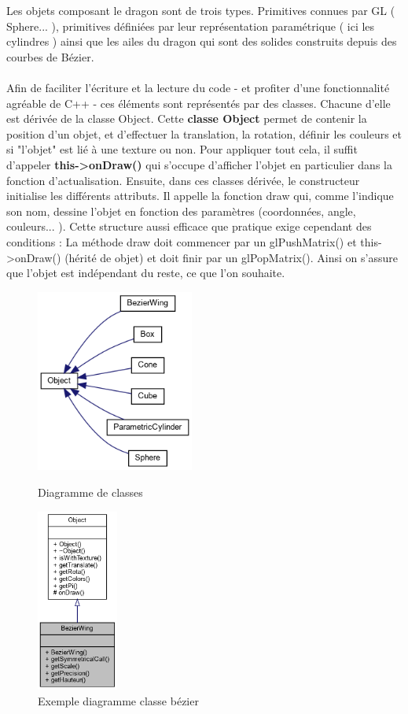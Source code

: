\documentclass{article}
\begin{document}
Les objets composant le dragon sont de trois types. Primitives connues par GL ( Sphere... ), primitives définiées par leur représentation paramétrique ( ici les cylindres ) ainsi que les ailes du dragon qui sont des solides construits depuis des courbes de Bézier.
\\~\\
Afin de faciliter l'écriture et la lecture du code - et profiter d'une fonctionnalité agréable de C++ - ces éléments sont représentés par des classes. Chacune d'elle est dérivée de la classe Object. Cette \textbf{classe Object} permet de contenir la position d'un objet, et d'effectuer la translation, la rotation, définir les couleurs et si "l'objet" est lié à une texture ou non. Pour appliquer tout cela, il suffit d'appeler \textbf{this->onDraw()} qui s'occupe d'afficher l'objet en particulier dans la fonction d'actualisation. Ensuite, dans ces classes dérivée, le constructeur initialise les différents attributs. Il appelle la fonction draw qui, comme l'indique son nom, dessine l'objet en fonction des paramètres (coordonnées, angle, couleurs... ). Cette structure aussi efficace que pratique exige cependant des conditions : La méthode draw doit commencer par un glPushMatrix() et this->onDraw() (hérité de objet) et doit finir par un glPopMatrix(). Ainsi on s'assure que l'objet est indépendant du reste, ce que l'on souhaite.

\begin{figure}[!htb]
	\begin{minipage}{0.5\textwidth}
    	\centering
    	\includegraphics[height=6cm]{./assets/class_hierarchy.png}
    	\caption{Diagramme de classes}
    	\label{fig:class_hierarchy}
	\end{minipage}
	\hfill
	\begin{minipage}{0.5\textwidth}
    	\centering
    	\includegraphics[height=6cm]{./assets/class_hierarchy_bezier.png}
    	\caption{Exemple diagramme classe bézier}
    	\label{fig:class_hierarchy_bezier}
	\end{minipage}
\end{figure}
\end{document}
